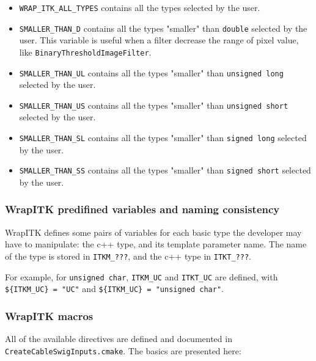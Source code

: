 \documentclass{InsightArticle}
\begin{document}
\begin{itemize}
  \item \verb$WRAP_ITK_ALL_TYPES$ contains all the types selected by the user.

  \item \verb$SMALLER_THAN_D$ contains all the types "smaller" than \verb$double$
selected by the user. This variable is useful when a filter decrease the range
of pixel value, like \verb$BinaryThresholdImageFilter$.

  \item \verb$SMALLER_THAN_UL$ contains all the types "smaller" than \verb$unsigned long$
selected by the user.

  \item \verb$SMALLER_THAN_US$ contains all the types "smaller" than \verb$unsigned short$
selected by the user.

  \item \verb$SMALLER_THAN_SL$ contains all the types "smaller" than \verb$signed long$
selected by the user.

  \item \verb$SMALLER_THAN_SS$ contains all the types "smaller" than \verb$signed short$
selected by the user.

\end{itemize}


     \subsubsection{WrapITK predifined variables and naming consistency}

WrapITK defines some pairs of variables for each basic type the developer may have
to manipulate: the c++ type, and its template parameter name. The name of the type
is stored in \verb$ITKM_???$, and the c++ type in \verb$ITKT_???$.

For example, for \verb$unsigned char$, \verb$ITKM_UC$ and \verb$ITKT_UC$
are defined, with \verb|${ITKM_UC} = "UC"| and \verb|${ITKM_UC} = "unsigned char"|.

     \subsubsection{WrapITK macros}

All of the available directives are defined and documented
in \verb$CreateCableSwigInputs.cmake$. The basics are presented here:
\end{document}
